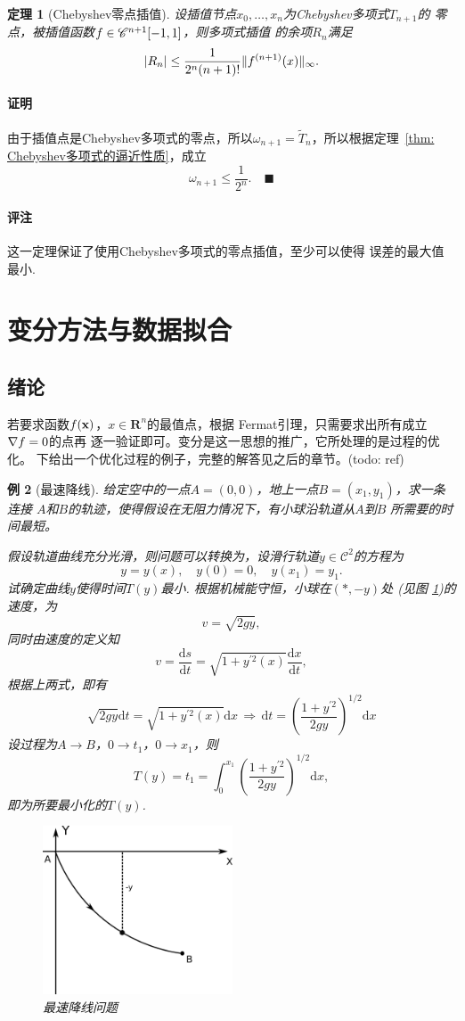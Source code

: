 \documentclass[12pt, a4paper]{article}
\theoremstyle{margin}
\newtheorem{thm}{定理}
\newtheorem{exa}[thm]{例}
\newcommand{\pr}{\prime}
\newcommand{\ms}{\mathscr}
\newcommand{\mbf}{\mathbf}
\newcommand{\f}{\mathnormal{f}}
\newcommand{\R}{\mathbf{R}}
\newcommand{\rd}{\mathrm{d}}
\newcommand\thmref[1]{定理~\ref{#1}}
\newcommand\figref[1]{图 \ref{#1}}
\newcommand{\remark}{\paragraph{评注}}
\newcommand{\proof}{\paragraph{证明}}
\begin{document}
  \begin{thm}[Chebyshev零点插值]
    设插值节点$x_0,\dots,x_n$为Chebyshev多项式$T_{n+1}$的
    零点，被插值函数$\f\in\ms{C}^{n+1}[-1, 1]$，则多项式插值
    的余项$R_n$满足
    \[
      |R_n| \le \frac{1}{2^n(n+1)!}\|\f^{(n+1)}(x)\|_{\infty}.
    \]
  \end{thm}
  \proof
    由于插值点是Chebyshev多项式的零点，所以$\omega_{n+1}=
    \widetilde{T}_n$，所以根据\thmref{thm: Chebyshev多项式的逼近性质}，成立
    \[
      \omega_{n+1} \le \frac{1}{2^n}.\quad\blacksquare
    \]
  \remark
    这一定理保证了使用Chebyshev多项式的零点插值，至少可以使得
    误差的最大值最小.

\newpage
\section{变分方法与数据拟合}
\subsection{绪论}
  若要求函数$\f(\mbf{x})$，$x\in\R^n$的最值点，根据
  Fermat引理，只需要求出所有成立$\nabla\f = 0$的点再
  逐一验证即可。变分是这一思想的推广，它所处理的是过程的优化。
  下给出一个优化过程的例子，完整的解答见之后的章节。(todo: ref)

  \begin{exa}[最速降线]
    给定空中的一点$A=(0,0)$，地上一点$B=(x_1,y_1)$，求一条连接
    $A$和$B$的轨迹，使得假设在无阻力情况下，有小球沿轨道从$A$到$B$
    所需要的时间最短。\par
    假设轨道曲线充分光滑，则问题可以转换为，设滑行轨道$y\in\ms{C}^2$的方程为
    \[
      y=y(x), \quad y(0)=0,\quad y(x_1) = y_1.
    \]
    试确定曲线$y$使得时间$T(y)$最小. 根据机械能守恒，小球在$(*,-y)$处
    (见\figref{fig: 最速降线问题})的速度，为
    \[
      v = \sqrt{2gy},
    \]
    同时由速度的定义知
    \[
      v = \frac{\rd s}{\rd t} = \sqrt{1+y^{\pr2}(x)}\frac{\rd x}{\rd t},
    \]
    根据上两式，即有
    \[
      \sqrt{2gy}\rd t = \sqrt{1+y^{\pr2}(x)}\rd x \,\Rightarrow\,
      \rd t = \left( \frac{1+y^{\pr2}}{2gy} \right)^{1/2}\rd x
    \]
    设过程为$A\to B$，$0\to t_1$，$0\to x_1$，则
    \[
      T(y) = t_1 = \int_0^{x_1} \left( \frac{1+y^{\pr2}}{2gy} \right)^{1/2}\rd x,
    \]
    即为所要最小化的$T(y)$.
    \begin{figure}[htbp]
      \centering
      \includegraphics[height=5cm]{../image/brachistochrone.png}
      \caption{最速降线问题}
      \label{fig: 最速降线问题}
    \end{figure}
  \end{exa}
\end{document}
